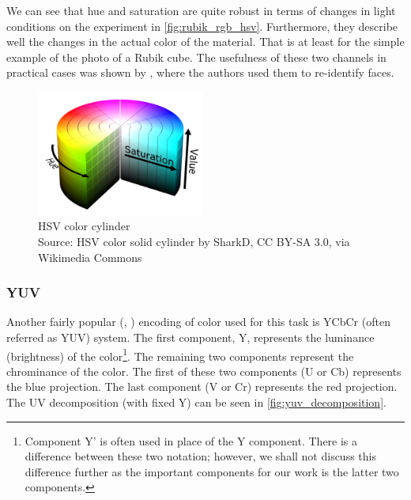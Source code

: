

We can see that hue and saturation are quite robust in terms of changes in light conditions on the experiment in \autoref{fig:rubik_rgb_hsv}. Furthermore, they describe well the changes in the actual color of the material. That is at least for the simple example of the photo of a Rubik cube. The usefulness of these two channels in practical cases was shown by \cite{mckenna1997tracking}, where the authors used them to re-identify faces.

\begin{figure}
    \centering
    \includegraphics[width=5.5cm]{img/HSV_color_solid_cylinder.png}
    \caption[HSV color cylinder]{HSV color cylinder\\Source: HSV color solid cylinder\protect\footnotemark{} by SharkD, CC BY-SA 3.0\protect\footnotemark{}, via Wikimedia Commons}
    \label{fig:hsv_cylinder}
\end{figure}
\addtocounter{footnote}{-2}

\subsubsection{YUV}

Another fairly popular (\cite{orwell1999multi}, \cite{wren1997pfinder}) encoding of color used for this task is YCbCr (often referred as YUV) system. The first component, Y, represents the luminance (brightness) of the color\footnote{Component Y' is often used in place of the Y component. There is a difference between these two notation; however, we shall not discuss this difference further as the important components for our work is the latter two components.}. The remaining two components represent the chrominance of the color. The first of these two components (U or Cb) represents the blue projection. The last component (V or Cr) represents the red projection. The UV decomposition (with fixed Y) can be seen in \autoref{fig:yuv_decomposition}.

